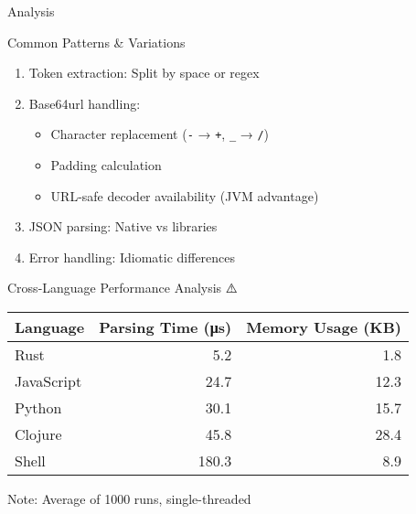 \documentclass[presentation,aspectratio=169]{beamer}
\begin{document}
\begin{frame}[label={sec:org9ebcdd3},fragile]{Analysis}
 \begin{block}{Common Patterns \& Variations 🧩}
\begin{enumerate}[<+->]
\item \alert{Token extraction}: Split by space or regex
\item \alert{Base64url handling}:
\begin{itemize}
\item Character replacement (\texttt{-} → \texttt{+}, \texttt{\_} → \texttt{/})
\item Padding calculation
\item URL-safe decoder availability (JVM advantage)
\end{itemize}
\item \alert{JSON parsing}: Native vs libraries
\item \alert{Error handling}: Idiomatic differences
\end{enumerate}
\end{block}
\begin{block}{Cross-Language Performance Analysis ⚠️}
\begin{center}
\begin{tabular}{lrr}
Language & Parsing Time (μs) & Memory Usage (KB)\\
\hline
Rust & 5.2 & 1.8\\
JavaScript & 24.7 & 12.3\\
Python & 30.1 & 15.7\\
Clojure & 45.8 & 28.4\\
Shell & 180.3 & 8.9\\
\end{tabular}
\end{center}

\alert{Note: Average of 1000 runs, single-threaded}
\end{block}
\end{frame}
\end{document}
